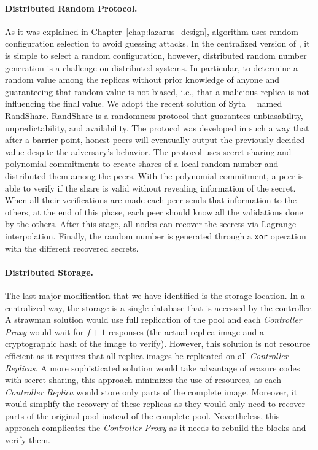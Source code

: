 \paragraph{Distributed Random Protocol.}
As it was explained in Chapter~\ref{chap:lazarus_design}, \system algorithm uses random configuration selection to avoid guessing attacks.
In the centralized version of \system, it is simple to select a random configuration, however, distributed random number generation is a challenge on distributed systems.
In particular, to determine a random value among the replicas without prior knowledge of anyone and guaranteeing that random value is not biased, i.e., that a malicious replica is not influencing the final value.
We adopt the recent solution of Syta~\etal{}~\cite{Syta:2017} named RandShare.
RandShare is a randomness protocol that guarantees unbiasability, unpredictability, and availability.
The protocol was developed in such a way that after a barrier point, honest peers will eventually output the previously decided value despite the adversary's behavior.
The protocol uses secret sharing and polynomial commitments to create shares of a local random number and distributed them among the peers.
With the polynomial commitment, a peer is able to verify if the share is valid without revealing information of the secret.
When all their verifications are made each peer sends that information to the others, at the end of this phase, each peer should know all the validations done by the others.
After this stage, all nodes can recover the secrets via Lagrange interpolation.
Finally, the random number is generated through a \texttt{xor} operation with the different recovered secrets.




\paragraph{Distributed Storage.}
The last major modification that we have identified is the storage location. 
In a centralized way, the storage is a single database that is accessed by the controller.
A strawman solution would use full replication of the pool and each \emph{Controller Proxy} would wait for $f+1$ responses (the actual replica image and a cryptographic hash of the image to verify).
However, this solution is not resource efficient as it requires that all replica images be replicated on all \emph{Controller Replicas}.
A more sophisticated solution would take advantage of erasure codes with secret sharing, this approach minimizes the use of resources, as each \emph{Controller Replica} would store only parts of the complete image.
Moreover, it would simplify the recovery of these replicas as they would only need to recover parts of the original pool instead of the complete pool.
Nevertheless, this approach complicates the \emph{Controller Proxy} as it needs to rebuild the blocks and verify them.


